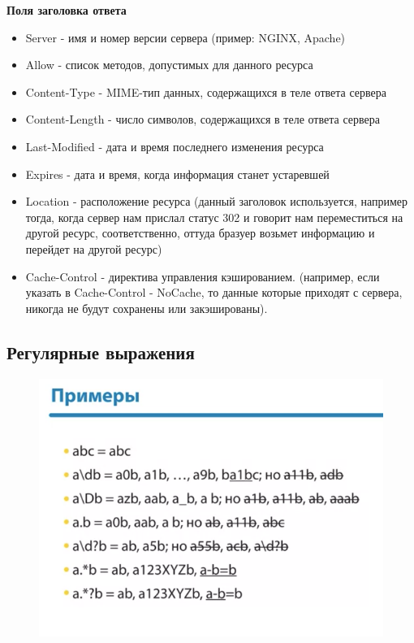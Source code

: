 \documentclass[a4paper,12pt]{article}
\begin{document}
	{\bf Поля заголовка ответа}
	\begin{itemize}
		\item Server - имя и номер версии сервера (пример: NGINX, Apache)
		\item Allow -  список методов, допустимых для данного ресурса
		\item Content-Type - MIME-тип данных, содержащихся в теле ответа сервера
		\item Content-Length - число символов, содержащихся в теле ответа сервера
		\item Last-Modified - дата и время последнего изменения ресурса
		\item Expires - дата и время, когда информация станет устаревшей
		\item Location - расположение ресурса (данный заголовок используется, например тогда, когда сервер нам прислал статус 302 и говорит нам переместиться на другой ресурс, соответственно, оттуда бразуер возьмет информацию и перейдет на другой ресурс)
		\item Cache-Control - директива управления кэшированием. (например, если указать в Cache-Control - NoCache, то данные которые приходят с сервера, никогда не будут сохранены или закэшированы).
	\end{itemize}
	
	
	
	\subsection{Регулярные выражения}
	
	\begin{figure}[h!]
		\begin{center}
			{\includegraphics[scale = 1]{14.png}}
			\label{14}
		\end{center}
	\end{figure}
	
\end{document}
